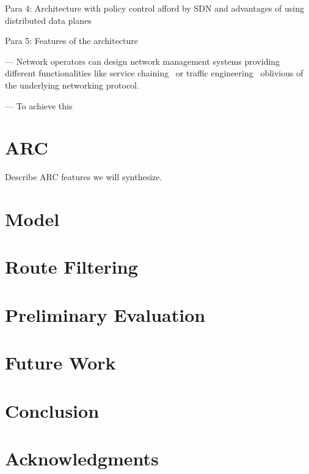 \documentclass{hotnets16}
\begin{document}
Para 4: Architecture with policy control afford by SDN and advantages of using
distributed data planes

Para 5: Features of the architecture

--- Network operators can design network management systems
providing different functionalities like service chaining~\cite{simple} or traffic
engineering~\cite{} oblivious of the underlying networking protocol.

--- To achieve this

\section{ARC}

Describe ARC features we will synthesize.

\section{Model}

\section{Route Filtering}

\section{Preliminary Evaluation}

\section{Future Work}

\section{Conclusion}

\section*{Acknowledgments}

 
\begin{small}

\end{small}
\label{last-page}
\end{document}
